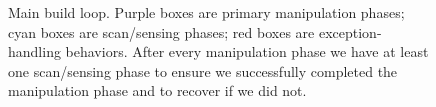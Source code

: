 \begin{figure}[H]
\caption{Main build loop. Purple boxes are primary manipulation phases; cyan boxes are scan/sensing phases; red boxes are exception-handling behaviors. After every manipulation phase we have at least one scan/sensing phase to ensure we successfully completed the manipulation phase and to recover if we did not.}
\label{fig:flow}
\end{figure}

\newpage
